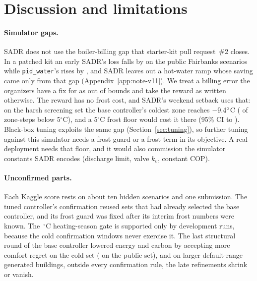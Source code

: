 \documentclass{article}
\begin{document}
\section{Discussion and limitations}
\label{sec:limits}
\paragraph{Simulator gaps.} SADR does not use the boiler-billing gap that starter-kit pull request~\#2 closes. In a patched kit an early SADR's loss falls by \RFivePrTwoVSevenRelAbs{} on the \RFivePrTwoVSevenN{} public Fairbanks scenarios while \texttt{pid\_water}'s rises by \RFivePrTwoPidRelAbs, and SADR leaves out a hot-water ramp whose saving came only from that gap (Appendix~\ref{app:note-v11}). We treat a billing error the organizers have a fix for as out of bounds and take the reward as written otherwise. The reward has no frost cost, and SADR's weekend setback uses that: on the harsh screening set the base controller's coldest zone reaches $-9.4^\circ$C (\RElvBelowFiveHS{} of zone-steps below 5$^\circ$C), and a 5$^\circ$C frost floor would cost it \RElvFrostHsRel{} there (95\% CI \RElvFrostHsLo{} to \RElvFrostHsHi). Black-box tuning exploits the same gap (Section~\ref{sec:tuning}), so further tuning against this simulator needs a frost guard or a frost term in its objective. A real deployment needs that floor, and it would also commission the simulator constants SADR encodes (discharge limit, valve $k_v$, constant COP).

\paragraph{Unconfirmed parts.} Each Kaggle score rests on about ten hidden scenarios and one submission. The tuned controller's confirmation reused sets that had already selected the base controller, and its frost guard was fixed after its interim frost numbers were known. The \RTenSeasonOatC\,$^\circ$C heating-season gate is supported only by development runs, because the cold confirmation windows never exercise it. The last structural round of the base controller lowered energy and carbon by accepting \RTenComfRiseHCThree{} more comfort regret on the cold set (\RTenComfRisePub{} on the public set), and on larger default-range generated buildings, outside every confirmation rule, the late refinements shrink or vanish.
\end{document}
